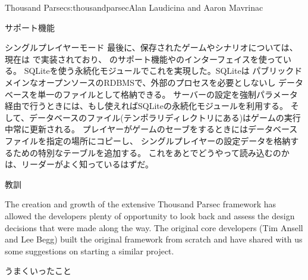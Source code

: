 \begin{aosachapter}{Thousand Parsec}{s:thousandparsec}{Alan Laudicina and Aaron Mavrinac}
\begin{aosasect1}{サポート機能}
\begin{aosasect2}{シングルプレイヤーモード}
最後に、保存されたゲームやシナリオについては、現在は
で実装されており、
のサポート機能やのインターフェイスを使っている。
SQLiteを使う永続化モジュールでこれを実現した。SQLiteは
パブリックドメインなオープンソースのRDBMSで、外部のプロセスを必要としないし
データベースを単一のファイルとして格納できる。
サーバーの設定を強制パラメータ経由で行うときには、もし使えればSQLiteの永続化モジュールを利用する。
そして、データベースのファイル(テンポラリディレクトリにある)はゲームの実行中常に更新される。
プレイヤーがゲームのセーブをするときにはデータベースファイルを指定の場所にコピーし、
シングルプレイヤーの設定データを格納するための特別なテーブルを追加する。
これをあとでどうやって読み込むのかは、リーダーがよく知っているはずだ。

\end{aosasect2}

\end{aosasect1}

\begin{aosasect1}{教訓}

The creation and growth of the extensive Thousand Parsec framework has
allowed the developers plenty of opportunity to look back and assess
the design decisions that were made along the way. The original core
developers (Tim Ansell and Lee Begg) built the original framework from
scratch and have shared with us some suggestions on starting a similar
project.

\begin{aosasect2}{うまくいったこと}


\end{aosasect2}
\end{aosasect1}
\end{aosachapter}
